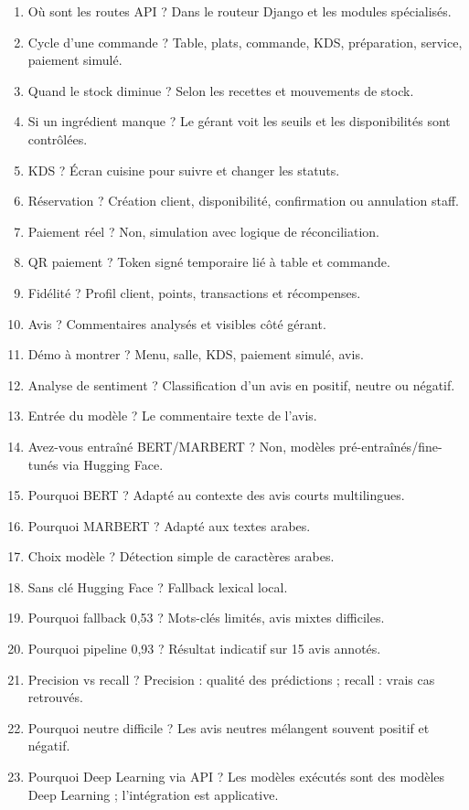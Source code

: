 \documentclass[11pt,a4paper]{article}
\begin{document}
\begin{enumerate}
\item Où sont les routes API ? Dans le routeur Django et les modules spécialisés.
\item Cycle d'une commande ? Table, plats, commande, KDS, préparation, service, paiement simulé.
\item Quand le stock diminue ? Selon les recettes et mouvements de stock.
\item Si un ingrédient manque ? Le gérant voit les seuils et les disponibilités sont contrôlées.
\item KDS ? Écran cuisine pour suivre et changer les statuts.
\item Réservation ? Création client, disponibilité, confirmation ou annulation staff.
\item Paiement réel ? Non, simulation avec logique de réconciliation.
\item QR paiement ? Token signé temporaire lié à table et commande.
\item Fidélité ? Profil client, points, transactions et récompenses.
\item Avis ? Commentaires analysés et visibles côté gérant.
\item Démo à montrer ? Menu, salle, KDS, paiement simulé, avis.
\item Analyse de sentiment ? Classification d'un avis en positif, neutre ou négatif.
\item Entrée du modèle ? Le commentaire texte de l'avis.
\item Avez-vous entraîné BERT/MARBERT ? Non, modèles pré-entraînés/fine-tunés via Hugging Face.
\item Pourquoi BERT ? Adapté au contexte des avis courts multilingues.
\item Pourquoi MARBERT ? Adapté aux textes arabes.
\item Choix modèle ? Détection simple de caractères arabes.
\item Sans clé Hugging Face ? Fallback lexical local.
\item Pourquoi fallback 0,53 ? Mots-clés limités, avis mixtes difficiles.
\item Pourquoi pipeline 0,93 ? Résultat indicatif sur 15 avis annotés.
\item Precision vs recall ? Precision : qualité des prédictions ; recall : vrais cas retrouvés.
\item Pourquoi neutre difficile ? Les avis neutres mélangent souvent positif et négatif.
\item Pourquoi Deep Learning via API ? Les modèles exécutés sont des modèles Deep Learning ; l'intégration est applicative.

\end{enumerate}
\end{document}

